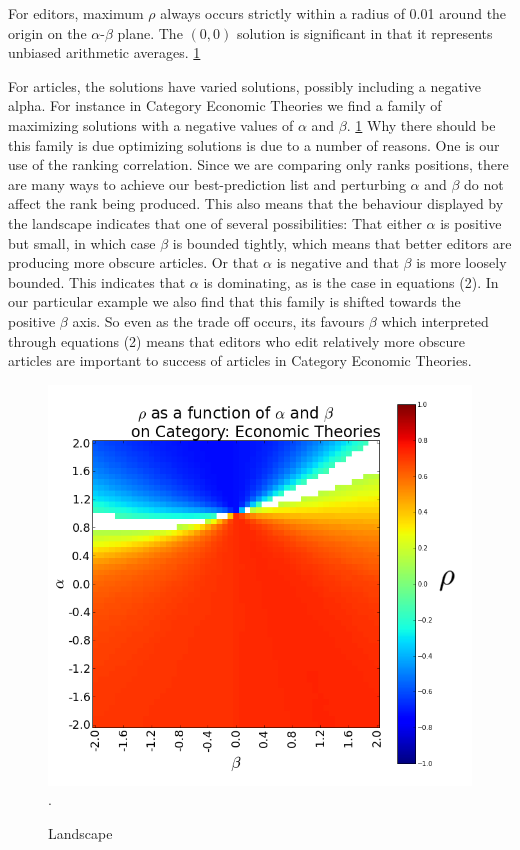 For editors, maximum $\rho$ always occurs strictly within a radius of 0.01 around the origin on the  $\alpha$-$\beta$ plane. The $(0,0)$ solution is significant in that it represents unbiased arithmetic averages.
\ref{fig:landscape}

For articles, the solutions have varied solutions, possibly including a negative alpha. For instance in Category Economic Theories we find a family of maximizing solutions with a negative values of $\alpha$ and $\beta$. \ref{fig:landscape} Why there should be this family is due optimizing solutions is due to a number of reasons. One is our use of the ranking correlation. Since we are comparing only ranks positions, there are many ways to achieve our best-prediction list and perturbing $\alpha$ and $\beta$ do not affect the rank being produced. This also means that the behaviour displayed by the  landscape indicates that one of several possibilities: That either $\alpha$ is positive but small, in which case $\beta$ is bounded tightly, which means that better editors are producing more obscure articles. Or that $\alpha$ is negative and that $\beta$ is more loosely bounded. This indicates that $\alpha$ is dominating, as is the case in equations (2). In our particular example we also find that this family is shifted towards the positive $\beta$ axis. So even as the trade off occurs, its favours $\beta$ which interpreted through equations (2) means that editors who edit relatively more obscure articles are important to success of articles in Category Economic Theories.

\begin{figure}[!t]
\centering
\includegraphics[width=0.9\columnwidth]{landscape.png}.
\caption{Landscape}
\label{fig:landscape}
\end{figure}

